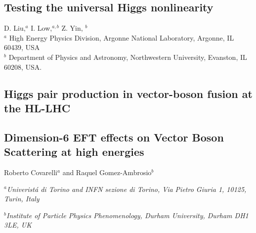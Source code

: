 \documentclass[../report.tex]{subfiles}
\providecommand{\main}{..}
\begin{document}
\subsection{Testing the universal Higgs nonlinearity}
% 
\label{sect-illus}
\begin{center}
 {D. Liu,$^a$   I. Low,$^{a,b} $ Z. Yin, $^b$\\
}
 {\small $^a$ High Energy Physics Division, Argonne National Laboratory, Argonne, IL 60439, USA \\
$^b$ Department of Physics and Astronomy, Northwestern University, Evanston, IL 60208, USA.}
\end{center}







\subsection{Higgs pair production in vector-boson fusion at the HL-LHC}\label{sec:VVHHcont}










\subsection{Dimension-6 EFT effects on Vector Boson Scattering at high energies}\label{sec:VBFdim6eft}

\begin{center}
{Roberto Covarelli$^{a}$ and  Raquel Gomez-Ambrosio$^{b}$}
\centerline{$^a${\it Univerist\'a di Torino and INFN sezione di Torino, Via Pietro Giuria 1, 10125, Turin, Italy}}
\centerline{$^b${\it Institute of Particle Physics Phenomenology, Durham University, Durham DH1 3LE, UK}}
\end{center}
\end{document}
